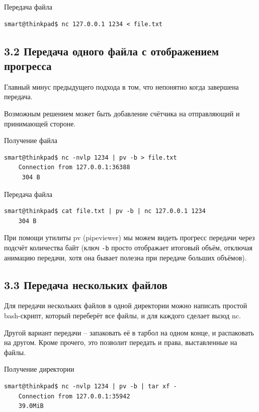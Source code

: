 Передача файла
\begin{Verbatim}[frame=single,breaklines=true,breakanywhere=true]
    smart@thinkpad$ nc 127.0.0.1 1234 < file.txt

\end{Verbatim}

\subsection*{3.2 Передача одного файла с отображением прогресса}

Главный минус предыдущего подхода в том, что непонятно когда завершена передача.

Возможным решением может быть добавление счётчика на отправляющий и принимающей стороне.

Получение файла
\begin{Verbatim}[frame=single,breaklines=true,breakanywhere=true]
    smart@thinkpad$ nc -nvlp 1234 | pv -b > file.txt
    Connection from 127.0.0.1:36388
     304 B
\end{Verbatim}

Передача файла
\begin{Verbatim}[frame=single,breaklines=true,breakanywhere=true]
    smart@thinkpad$ cat file.txt | pv -b | nc 127.0.0.1 1234
    304 B
\end{Verbatim}

При помощи утилиты pv (pipeviewer) мы можем видеть прогресс передачи через подсчёт количества байт (ключ \texttt{-b} просто отображает итоговый объём, отключая анимацию передачи, хотя она бывает полезна при передаче больших объёмов).

\subsection*{3.3 Передача нескольких файлов}

Для передачи нескольких файлов в одной директории можно написать простой bash-скрипт, который переберёт все файлы, и для каждого сделает вызод nc.

Другой вариант передачи -- запаковать её в тарбол на одном конце, и распаковать на другом. Кроме прочего, это позволит передать и права, выставленные на файлы.

Получение директории
\begin{Verbatim}[frame=single,breaklines=true,breakanywhere=true]
    smart@thinkpad$ nc -nvlp 1234 | pv -b | tar xf -
    Connection from 127.0.0.1:35942
    39.0MiB
\end{Verbatim}

